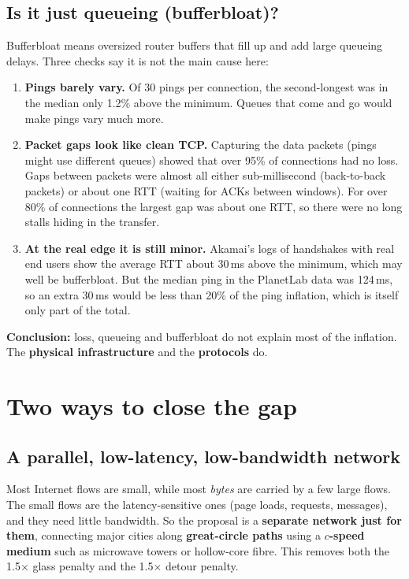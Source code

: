 \subsection{Is it just queueing (bufferbloat)?}
Bufferbloat means oversized router buffers that fill up and add large queueing delays. Three checks say it is not the main cause here:
\begin{enumerate}
  \item \textbf{Pings barely vary.} Of 30 pings per connection, the second-longest was in the median only 1.2\% above the minimum. Queues that come and go would
        make pings vary much more.
  \item \textbf{Packet gaps look like clean TCP.} Capturing the data packets (pings might use different queues) showed that over 95\% of connections had no loss.
        Gaps between packets were almost all either sub-millisecond (back-to-back packets) or about one RTT (waiting for ACKs between windows). For over 80\% of connections
        the largest gap was about one RTT, so there were no long stalls hiding in the transfer.
  \item \textbf{At the real edge it is still minor.} Akamai's logs of handshakes with real end users show the average RTT about 30\,ms above the minimum, which may
        well be bufferbloat. But the median ping in the PlanetLab data was 124\,ms, so an extra 30\,ms would be less than 20\% of the ping inflation, which is itself only part of the total.
\end{enumerate}
\textbf{Conclusion:} loss, queueing and bufferbloat do not explain most of the inflation. The \textbf{physical infrastructure} and the \textbf{protocols} do.

\section{Two ways to close the gap}

\subsection{A parallel, low-latency, low-bandwidth network}
Most Internet flows are small, while most \emph{bytes} are carried by a few large flows. The small flows are the latency-sensitive ones (page loads,
requests, messages), and they need little bandwidth. So the proposal is a \textbf{separate network just for them}, connecting major cities along
\textbf{great-circle paths} using a \textbf{$c$-speed medium} such as microwave towers or hollow-core fibre. This removes both the 1.5$\times$ glass penalty and
the 1.5$\times$ detour penalty.

